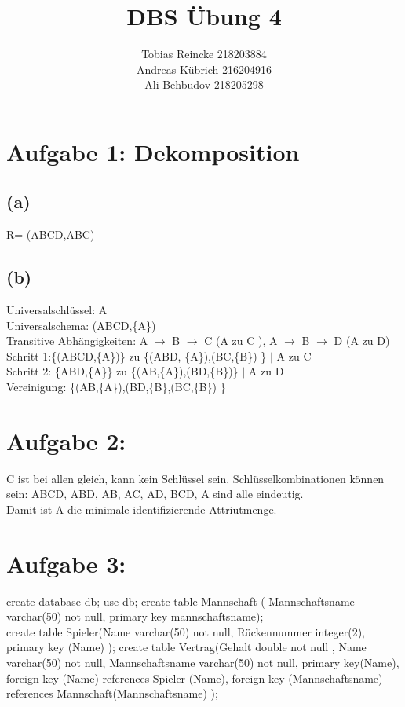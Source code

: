 \documentclass[11pt]{article} %
\title{\color{blue}DBS Übung 4}
\author{Tobias Reincke 218203884 \\
	Andreas Kübrich 216204916 \\
    Ali Behbudov 218205298}
\begin{document}
\maketitle
\section*{ \textbf{Aufgabe 1: Dekomposition}}

\subsection*{(a)} R= (ABCD,{ABC})
\subsection*{(b)} Universalschlüssel: A \\
Universalschema: (ABCD,\{A\})\\                                                                                                                                        
Transitive Abhängigkeiten: A $\rightarrow$ B $\rightarrow$ C (A zu C ), A $\rightarrow$ B $\rightarrow$ D (A zu D)\\ 
Schritt 1:\{(ABCD,\{A\})\} zu \{(ABD, \{A\}),(BC,\{B\}) \} $|$ A zu C \\
Schritt 2: \{ABD,\{A\}\} zu  \{(AB,\{A\}),(BD,\{B\})\} $|$ A zu D \\
Vereinigung: \{(AB,\{A\}),(BD,\{B\},(BC,\{B\}) \}

\section*{\textbf{Aufgabe 2: }}
C ist bei allen gleich, kann kein Schlüssel sein.
Schlüsselkombinationen können sein: 
ABCD, ABD, AB, AC, AD,  BCD, A sind alle eindeutig. \\
Damit ist A die minimale identifizierende Attriutmenge.


\section*{\textbf{Aufgabe 3:}}
create  database db; 
use db;
create table Mannschaft ( Mannschaftsname varchar(50) not null, primary key mannschaftsname);\\
create table Spieler(Name varchar(50) not null,  Rückennummer integer(2), primary key (Name) );
create table Vertrag(Gehalt double not null , Name varchar(50) not null, Mannschaftsname varchar(50) not null, primary key(Name), foreign key (Name) references Spieler (Name), foreign key (Mannschaftsname) references Mannschaft(Mannschaftsname) );
\end{document}

